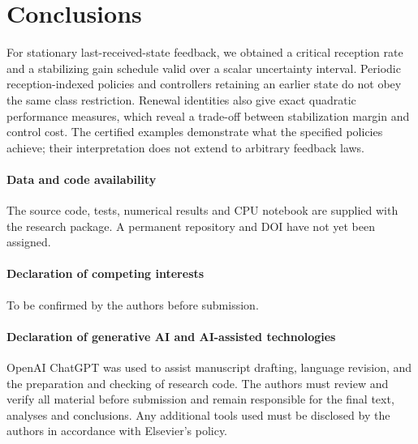\documentclass[preprint,12pt,numbers]{elsarticle}
\theoremstyle{definition}
\begin{document}
\section{Conclusions}
For stationary last-received-state feedback, we obtained a critical reception rate and a stabilizing gain schedule valid over a scalar uncertainty interval. Periodic reception-indexed policies and controllers retaining an earlier state do not obey the same class restriction. Renewal identities also give exact quadratic performance measures, which reveal a trade-off between stabilization margin and control cost. The certified examples demonstrate what the specified policies achieve; their interpretation does not extend to arbitrary feedback laws.

\paragraph{Data and code availability}
The source code, tests, numerical results and CPU notebook are supplied with the research package. A permanent repository and DOI have not yet been assigned.
\paragraph{Declaration of competing interests}
To be confirmed by the authors before submission.
\paragraph{Declaration of generative AI and AI-assisted technologies}
OpenAI ChatGPT was used to assist manuscript drafting, language revision, and the preparation and checking of research code. The authors must review and verify all material before submission and remain responsible for the final text, analyses and conclusions. Any additional tools used must be disclosed by the authors in accordance with Elsevier's policy.
\end{document}
